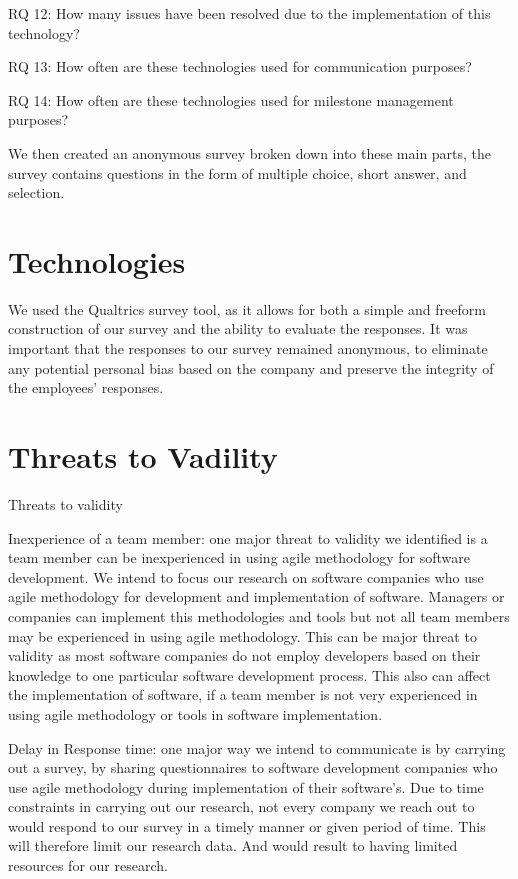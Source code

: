 \documentclass[conference]{IEEEtran}
\begin{document}
RQ 12: How many issues have been resolved due to the implementation of this technology? 

RQ 13: How often are these technologies used for communication purposes? 

RQ 14: How often are these technologies used for milestone management purposes? 
 

We then created an anonymous survey broken down into these main parts, the survey contains questions in the form of multiple choice, short answer, and selection.  

\section{Technologies}
We used the Qualtrics survey tool, as it allows for both a simple and freeform construction of our survey and the ability to evaluate the responses. It was important that the responses to our survey remained anonymous, to eliminate any potential personal bias based on the company and preserve the integrity of the employees' responses. 

\section{Threats to Vadility}
Threats to validity

Inexperience of a team member: one major threat to validity we identified is a team member can be inexperienced in using agile methodology for software development. We intend to focus our research on software companies who use agile methodology for development and implementation of software. Managers or companies can implement this methodologies and tools but not all team members may be experienced in using agile methodology. This can be major threat to validity as most software companies do not employ developers based on their knowledge to one particular software development process. This also can affect the implementation of software, if a team member is not very experienced in using agile methodology or tools in software implementation.

Delay in Response time: one major way we intend to communicate is by carrying out a survey, by sharing questionnaires to software development companies who use agile methodology during implementation of their software’s. Due to time constraints in carrying out our research, not every company we reach out to would respond to our survey in a timely manner or given period of time. This will therefore limit our research data. And would result to having limited resources for our research.
\end{document}
